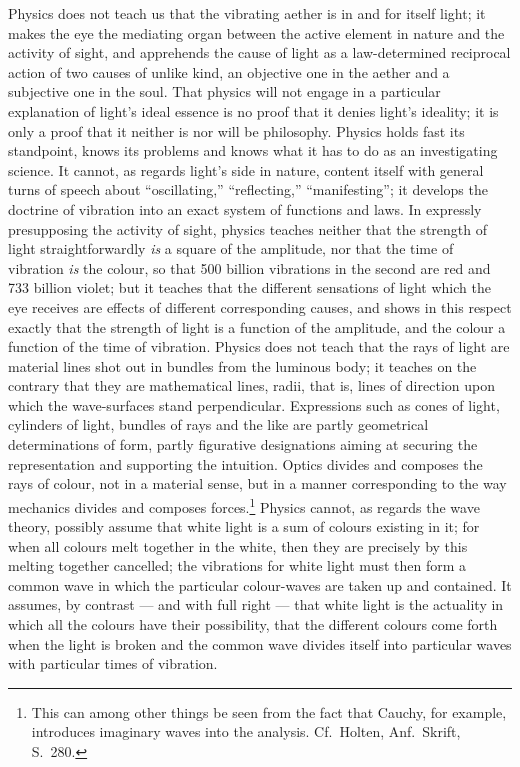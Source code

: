 \documentclass[12pt,a4paper]{book}
\begin{document}
Physics does not teach us that the vibrating aether is in and for itself light; it makes the eye the mediating organ
between the active element in nature and the activity of sight, and apprehends the cause of light as a law-determined
reciprocal action of two causes of unlike kind, an objective one in the aether and a subjective one in the soul. That
physics will not engage in a particular explanation of light's ideal essence is no proof that it denies light's
ideality; it is only a proof that it neither is nor will be philosophy. Physics holds
fast its standpoint, knows its problems and knows what it has to do as an investigating science. It cannot, as regards
light's side in nature, content itself with general turns of speech about ``oscillating,'' ``reflecting,''
``manifesting''; it develops the doctrine of vibration into an exact system of functions and laws. In expressly
presupposing the activity of sight, physics teaches neither that the strength of light straightforwardly \emph{is} a
square of the amplitude, nor that the time of vibration \emph{is} the colour, so that 500 billion vibrations in the
second are red and 733 billion violet; but it teaches that the different sensations of light which the eye receives are
effects of different corresponding causes, and shows in this respect exactly that the strength of light is a function of
the amplitude, and the colour a function of the time of vibration. Physics does not teach that the rays of light are
material lines shot out in bundles from the luminous body; it teaches on the contrary that they are mathematical lines,
radii, that is, lines of direction upon which the wave-surfaces stand perpendicular. Expressions such as cones of light,
cylinders of light, bundles of rays and the like are partly geometrical determinations of form, partly figurative
designations aiming at securing the representation and supporting the intuition. Optics divides and composes the rays of
colour, not in a material sense, but in a manner corresponding to the way mechanics divides and composes
forces.\footnote{This can among other things be seen from the fact that Cauchy, for example, introduces imaginary waves
into the analysis. Cf.\ Holten, Anf.\ Skrift, S.\ 280.} Physics cannot, as regards the wave theory, possibly assume that
white light is a sum of colours existing in it; for when all colours melt together in the white, then they are precisely
by this melting together cancelled; the vibrations for white light must then form a common wave in which the particular
colour-waves are taken up and contained. It assumes, by contrast --- and with
full right --- that white light is the actuality in which all the colours have their possibility, that the different
colours come forth when the light is broken and the common wave divides itself into particular waves with particular
times of vibration.
\end{document}
